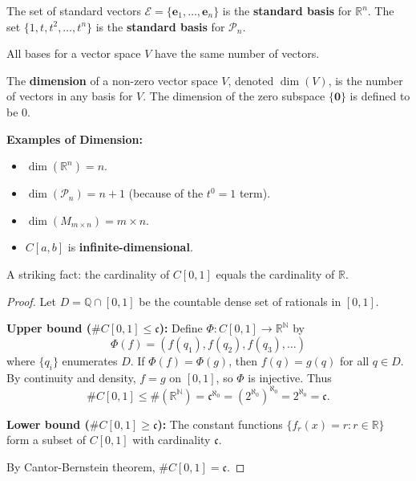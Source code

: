 \begin{example}
The set of standard vectors $\mathcal{E} = \{\mathbf{e}_1, \ldots, \mathbf{e}_n\}$ is the \textbf{standard basis} for $\mathbb{R}^n$.
The set $\{1, t, t^2, \ldots, t^n\}$ is the \textbf{standard basis} for $\mathcal{P}_n$.
\end{example}

\begin{theorem}
All bases for a vector space $V$ have the same number of vectors.
\end{theorem}

\begin{definition}
The \textbf{dimension} of a non-zero vector space $V$, denoted $\dim(V)$, is the number of vectors in any basis for $V$. The dimension of the zero subspace $\{\mathbf{0}\}$ is defined to be 0.
\end{definition}

\textbf{Examples of Dimension:}
\begin{itemize}
    \item $\dim(\mathbb{R}^n) = n$.
    \item $\dim(\mathcal{P}_n) = n+1$ (because of the $t^0=1$ term).
    \item $\dim(M_{m \times n}) = m \times n$.
    \item $C[a, b]$ is \textbf{infinite-dimensional}.
\end{itemize}

A striking fact: the cardinality of $C[0,1]$ equals the cardinality of $\mathbb{R}$.

\begin{proof}
Let $D = \mathbb{Q} \cap [0,1]$ be the countable dense set of rationals in $[0,1]$.

\textbf{Upper bound ($\#C[0,1] \leq \mathfrak{c}$):} Define $\Phi: C[0,1] \to \mathbb{R}^\mathbb{N}$ by
\[
\Phi(f) = (f(q_1), f(q_2), f(q_3), \dots)
\]
where $\{q_i\}$ enumerates $D$. If $\Phi(f) = \Phi(g)$, then $f(q) = g(q)$ for all $q \in D$. By continuity and density, $f = g$ on $[0,1]$, so $\Phi$ is injective. Thus
\[
\#C[0,1] \leq \#(\mathbb{R}^\mathbb{N}) = \mathfrak{c}^{\aleph_0} = (2^{\aleph_0})^{\aleph_0} = 2^{\aleph_0} = \mathfrak{c}.
\]

\textbf{Lower bound ($\#C[0,1] \geq \mathfrak{c}$):} The constant functions $\{f_r(x) = r : r \in \mathbb{R}\}$ form a subset of $C[0,1]$ with cardinality $\mathfrak{c}$.

By Cantor-Bernstein theorem, $\#C[0,1] = \mathfrak{c}$.
\end{proof}

